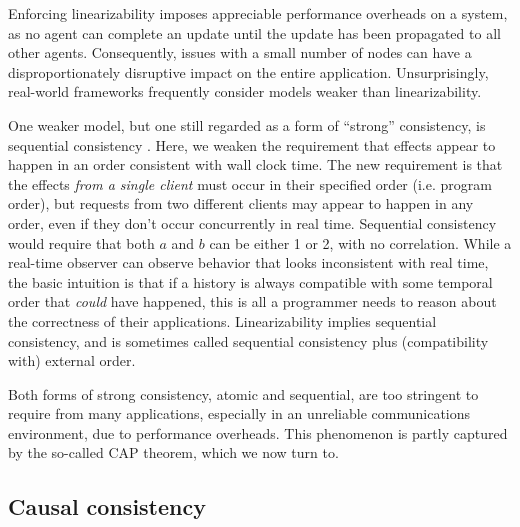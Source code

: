 Enforcing linearizability imposes appreciable performance overheads on
a system, as no agent can complete an update until the update has been
propagated to all other agents. Consequently, issues with a small
number of nodes can have a disproportionately disruptive impact on the
entire application. Unsurprisingly, real-world frameworks frequently
consider models weaker than linearizability.

One weaker model, but one still regarded as a form of ``strong''
consistency, is sequential consistency
\cite{1979LamportSequential}. Here, we weaken the requirement that
effects appear to happen in an order consistent with wall clock
time. The new requirement is that the effects \emph{from a single
client} must occur in their specified order (i.e. program order), but
requests from two different clients may appear to happen in any order,
even if they don't occur concurrently in real time. Sequential
consistency would require that both $a$ and $b$ can be either 1 or 2,
with no correlation. While a real-time observer can observe behavior
that looks inconsistent with real time, the basic intuition is that if
a history is always compatible with some temporal order that
\emph{could} have happened, this is all a programmer needs to reason
about the correctness of their applications. Linearizability implies
sequential consistency, and is sometimes called sequential consistency
plus (compatibility with) external order.

Both forms of strong consistency, atomic and sequential, are too
stringent to require from many applications, especially in an
unreliable communications environment, due to performance overheads.
This phenomenon is partly captured by the so-called CAP theorem, which
we now turn to.

\subsection{Causal consistency}

